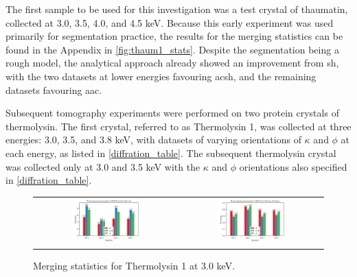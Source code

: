 The first sample to be used for this investigation was a test crystal of thaumatin, collected at 3.0, 3.5, 4.0, and 4.5 keV. Because this early experiment was used primarily for segmentation practice, the results for the merging statistics can be found in the Appendix in \cref{fig:thaum1_stats}. Despite the segmentation being a rough model, the analytical approach already showed an improvement from \ac{sh}, with the two datasets at lower energies favouring \ac{acsh}, and the remaining datasets favouring \ac{aac}.

Subsequent tomography experiments were performed on two protein crystals of thermolysin. The first crystal, referred to as Thermolysin 1, was collected at three energies: 3.0, 3.5, and 3.8 keV, with datasets of varying orientations of $\kappa$ and $\phi$ at each energy, as listed in \cref{diffration_table}. The subsequent thermolysin crystal was collected only at 3.0 and 3.5 keV with the $\kappa$ and $\phi$ orientations also specified in \cref{diffration_table}.

\begin{figure}
    \centering
    \begin{tabular}{cc}
    \includegraphics[width = 0.5\textwidth]{plots/exp1/tlys_9_P6122/3p0_I_over_sigma.png} & \includegraphics[width = 0.5\textwidth]{plots/exp1/tlys_9_P6122/3p0_rmerges.png}
    \end{tabular}
    \caption{Merging statistics for Thermolysin 1 at 3.0 keV.}
    \label{fig:tlys_9_3p0}
\end{figure}

